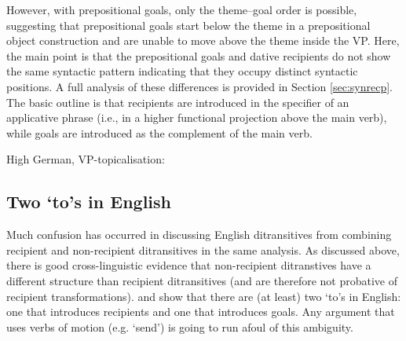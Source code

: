 	However, with prepositional goals, only the theme--goal order is possible, suggesting that prepositional goals start below the theme in a prepositional object construction and are unable to move above the theme inside the VP. Here, the main point is that the prepositional goals and dative recipients do not show the same syntactic pattern indicating that they occupy distinct syntactic positions. A full analysis of these differences is provided in Section \ref{sec:synrecp}. The basic outline is that recipients are introduced in the specifier of an applicative phrase (i.e., in a higher functional projection above the main verb), while goals are introduced as the complement of the main verb. 

	\begin{exe}
		\ex High German, VP-topicalisation:
		\begin{xlist}
		\end{xlist}
	\end{exe}

	\subsection{Two `to's in English}
	Much confusion has occurred in discussing English ditransitives from combining recipient and non-recipient ditransitives in the same analysis. As discussed above, there is good cross-linguistic evidence that non-recipient ditranstives have a different structure than recipient ditransitives (and are therefore not probative of recipient transformations). \cite{Levinson.2005} and \cite{Hovav.2008} show that there are (at least) two `to's in English: one that introduces recipients and one that introduces goals. Any argument that uses verbs of motion (e.g. `send') is going to run afoul of this ambiguity.

